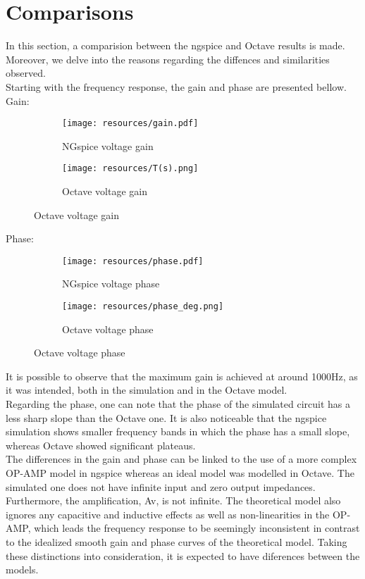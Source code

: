 \section{Comparisons}
\label{sec:comparsisons}

In this section, a comparision between the ngspice and Octave results is made. Moreover, we delve into the reasons regarding the diffences and similarities observed.\\
Starting with the frequency response, the gain and phase are presented bellow.\\
\FloatBarrier
Gain:
\begin{figure} [htb] 
	\begin{subfigure}[b]{0.5\textwidth}
		\centering
  		\texttt{[image: resources/gain.pdf]}
  		\caption{NGspice voltage gain}
	\end{subfigure}
  	\begin{subfigure}[b]{0.5\textwidth}
  		\centering
 		 \texttt{[image: resources/T(s).png]}
 		 \caption{Octave voltage gain}
  	\end{subfigure}
\end{figure}
\FloatBarrier
Phase:
\begin{figure} [htb] 
	\begin{subfigure}[b]{0.5\textwidth}
 		 \texttt{[image: resources/phase.pdf]}
  		\caption{NGspice voltage phase}
 		\label{fig:theoplots}
	\end{subfigure}
  	\begin{subfigure}[b]{0.5\textwidth}
  		\texttt{[image: resources/phase\_deg.png]}
 		 \caption{Octave voltage phase}
 		 \label{fig:theoplots}
  	\end{subfigure}
\end{figure}
\FloatBarrier
It is possible to observe that the maximum gain is achieved at around 1000Hz, as it was intended, both in the simulation and in the Octave model.\\
Regarding the phase, one can note that the phase of the simulated circuit has a less sharp slope than the Octave one. It is also noticeable that the ngspice simulation shows smaller frequency bands in which the phase has a small slope, whereas Octave showed significant plateaus.\\
The differences in the gain and phase can be linked to the use of a more complex OP-AMP model in ngspice whereas an ideal model was modelled in Octave. The simulated one does not have infinite input and zero output impedances. Furthermore, the amplification, Av, is not infinite. The theoretical model also ignores any capacitive and inductive effects as well as non-linearities in the OP-AMP, which leads the frequency response to be seemingly inconsistent in contrast to the idealized smooth gain and phase curves of the theoretical model. Taking these distinctions into consideration, it is expected to have diferences between the models.\\
